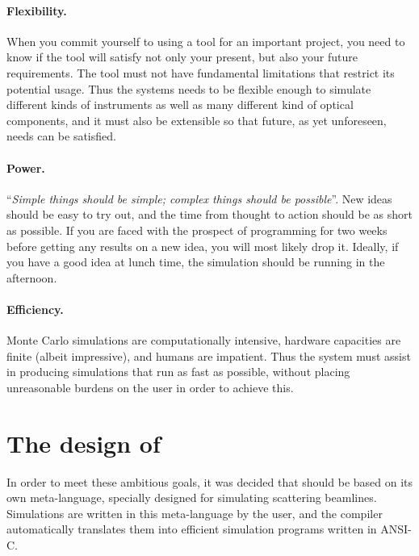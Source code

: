 \paragraph{Flexibility.}
When you commit yourself to using a tool for an important project, you
need to know if the tool will satisfy not only your present, but also
your future requirements. The tool must not have fundamental limitations that
restrict its potential usage. Thus the \MCX systems needs to be
flexible enough to simulate different kinds of instruments
as well as many different kind of
optical components, and it must also be extensible so that future, as
yet unforeseen, needs can be satisfied.
%
\paragraph{Power.}
``\textit{Simple things should be simple; complex things should be possible}''.
New ideas should be easy to try out, and the time from thought to action
should be as short as possible. If you are faced with the prospect of programming for
two weeks before getting any results on a new idea, you will most likely drop
it. Ideally, if you have a good idea at lunch time, the simulation
should be running in the afternoon.
%
\paragraph{Efficiency.}
Monte Carlo simulations are computationally intensive, hardware capacities
are finite (albeit impressive), and humans are impatient. Thus the
system must assist in producing simulations that run as fast as
possible, without placing unreasonable burdens on the user in order to
achieve this.


\section{The design of \MCX}
\label{s:design}

In order to meet these ambitious goals, it was decided that \MCX should
be based on its own meta-language, specially designed for
simulating scattering beamlines. Simulations are written in
this meta-language by the user, and the \MCX compiler automatically
translates them into efficient simulation programs written in ANSI-C.

